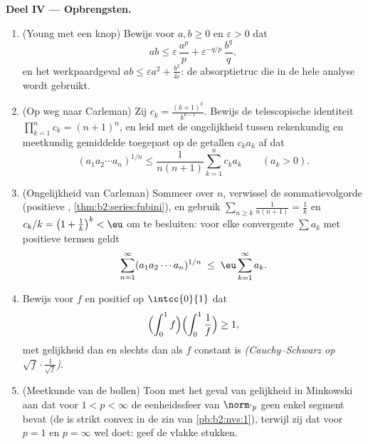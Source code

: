 \begin{problem}
\medskip
\noindent\textbf{Deel IV --- Opbrengsten.}
\begin{enumerate}[resume]
  \item (Young met een knop) Bewijs voor $a, b \geq 0$ en
        $\varepsilon > 0$ dat
        \[
        ab \leq \varepsilon\,\frac{a^p}{p} +
        \varepsilon^{-q/p}\,\frac{b^q}{q},
        \]
        en het werkpaardgeval $ab \leq \varepsilon a^2 +
        \frac{b^2}{4\varepsilon}$: de absorptietruc die in de hele
        analyse wordt gebruikt.
  \item (Op weg naar Carleman) Zij $c_k = \frac{(k+1)^k}{k^{k-1}}$.
        Bewijs de telescopische identiteit $\prod_{k=1}^{n}c_k =
        (n+1)^n$, en leid met de ongelijkheid tussen rekenkundig
        en meetkundig gemiddelde toegepast op de getallen $c_ka_k$
        af dat
        \[
        (a_1a_2\cdots a_n)^{1/n} \leq
        \frac{1}{n(n+1)}\sum_{k=1}^{n} c_k a_k
        \qquad (a_k > 0).
        \]
  \item (Ongelijkheid van Carleman) Sommeer over $n$, verwissel de
        sommatievolgorde (positieve ,
        \cref{thm:b2:series:fubini}), en gebruik $\sum_{n \geq
        k}\frac{1}{n(n+1)} = \frac1k$ en $c_k/k = \bigl(1 +
        \frac1k\bigr)^k < \eu$ om te besluiten: voor elke
        convergente $\sum a_k$ met positieve termen geldt
        \[
        \sum_{n=1}^{\infty}(a_1a_2\cdots a_n)^{1/n}
        \;\leq\; \eu\sum_{k=1}^{\infty}a_k .
        \]
  \item Bewijs voor $f$  en positief op $\intcc{0}{1}$ dat
        \[
        \Bigl(\int_0^1 f\Bigr)\Bigl(\int_0^1\frac1f\Bigr)
        \geq 1,
        \]
        met gelijkheid dan en slechts dan als $f$ constant is
        \emph{(Cauchy--Schwarz op $\sqrt f\cdot\frac1{\sqrt
        f}$)}.
  \item (Meetkunde van de bollen) Toon met het geval van
        gelijkheid in Minkowski aan dat voor $1 < p < \infty$ de
        eenheidssfeer van $\norm\cdot_p$ geen enkel segment bevat
        (de  is strikt convex in de zin van
        \cref{pb:b2:nvs:1}), terwijl zij dat voor $p = 1$ en $p =
        \infty$ wel doet: geef de vlakke stukken.
\end{enumerate}


\end{problem}
